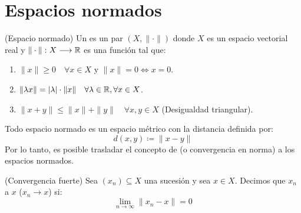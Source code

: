\chapter{Espacios normados}

\begin{definicion}(Espacio normado)
    Un  es un par $(X, \|\cdot\|)$ donde $X$ es un espacio vectorial real y $\|\cdot\| : X \longrightarrow \mathbb{R}$ es una función tal que:
    \begin{enumerate}
        \item [1)] $\|x\| \geq 0 \quad \forall x \in X$ y $\|x\| = 0 \iff x = 0$.
        \item [2)] $\|\lambda x\| = |\lambda| \cdot \|x\| \quad \forall \lambda \in \mathbb{R}, \forall x \in X$.
        \item [3)] $\|x + y\| \leq \|x\| + \|y\| \quad \forall x, y \in X$ (Desigualdad triangular).
    \end{enumerate}
\end{definicion}

\begin{observacion}
    Todo espacio normado es un espacio métrico con la distancia definida por:
    \begin{equation*}
        d(x,y) \coloneqq \|x - y\|
    \end{equation*}
    Por lo tanto, es posible trasladar el concepto de  (o convergencia en norma) a los espacios normados.
\end{observacion}

\begin{definicion}(Convergencia fuerte)
    Sea $(x_n) \subseteq X$ una sucesión y sea $x \in X$. Decimos que $x_n$  a $x$ ($x_n \to x$) si:
    \begin{equation*}
        \lim_{n \to \infty} \|x_n - x\| = 0
    \end{equation*}
\end{definicion}

